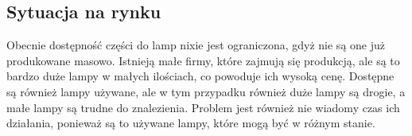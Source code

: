 \documentclass[../main.tex]{subfiles}
\begin{document}
\subsection{Sytuacja na rynku}
Obecnie dostępność części do lamp nixie jest ograniczona, gdyż nie są one już produkowane masowo. Istnieją małe firmy, które zajmują się produkcją, ale są to bardzo
duże lampy w małych ilościach, co powoduje ich wysoką cenę. Dostępne są również lampy używane, ale w tym przypadku również duże lampy są drogie, a małe lampy są trudne do znalezienia.
Problem jest również nie wiadomy czas ich działania, ponieważ są to używane lampy, które mogą być w różnym stanie.
\end{document}
